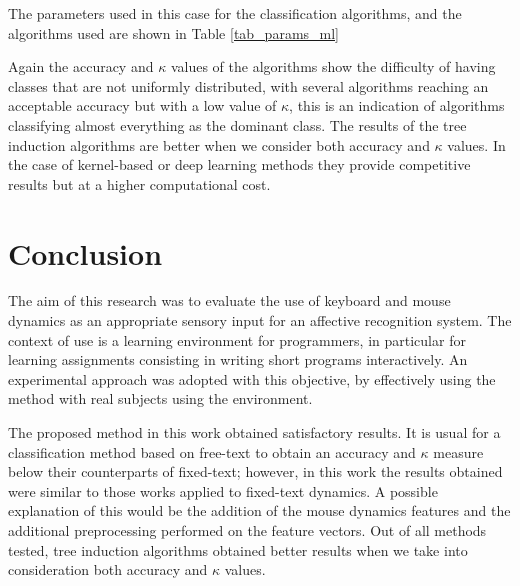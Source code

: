 \documentclass[a4paper,twoside]{article}
\begin{document}
      The parameters used in this case for the classification
      algorithms, and the algorithms used are shown in Table \ref{tab_params_ml}

Again the accuracy and $\kappa$ values of the
algorithms show the difficulty of having classes that are not uniformly
distributed, with several algorithms reaching an acceptable accuracy but with a
low value of  $\kappa$, this is an indication of algorithms classifying almost
everything as the dominant class. The results of the tree induction algorithms
are better when we consider both accuracy and  $\kappa$ values. In the case of
kernel-based or deep learning methods they provide competitive results but at a
higher computational cost.
 

\section{Conclusion}

The aim of this research was to evaluate the use of keyboard and mouse dynamics
as an appropriate sensory input for an affective recognition system. The context
of use is a learning environment for programmers, in particular for learning
assignments consisting in writing short programs interactively. An experimental
approach was adopted with this objective, by effectively using the
method with real subjects using the environment.

The proposed method in this work obtained
satisfactory results. It is usual for a classification method based on free-text
to obtain an accuracy and $\kappa$ measure below their counterparts of
fixed-text; however, in this
work the results obtained were similar to those works applied to fixed-text
dynamics. A possible explanation of this would be the addition of the mouse
dynamics features and the additional preprocessing performed on the
feature vectors.  Out of all methods tested, tree induction algorithms
obtained better results when we take into consideration both accuracy and  $\kappa$ values.
\end{document}
